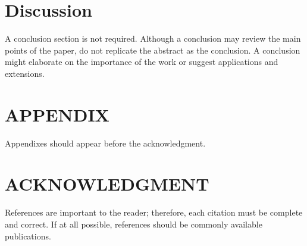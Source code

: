 \documentclass{vgtc}                          %
\begin{document}


\section{Discussion}

A conclusion section is not required. Although a conclusion may review the main points of the paper, do not replicate the abstract as the conclusion. A conclusion might elaborate on the importance of the work or suggest applications and extensions. 

\section*{APPENDIX}

Appendixes should appear before the acknowledgment.

\section*{ACKNOWLEDGMENT}




References are important to the reader; therefore, each citation must be complete and correct. If at all possible, references should be commonly available publications.



\end{document}
